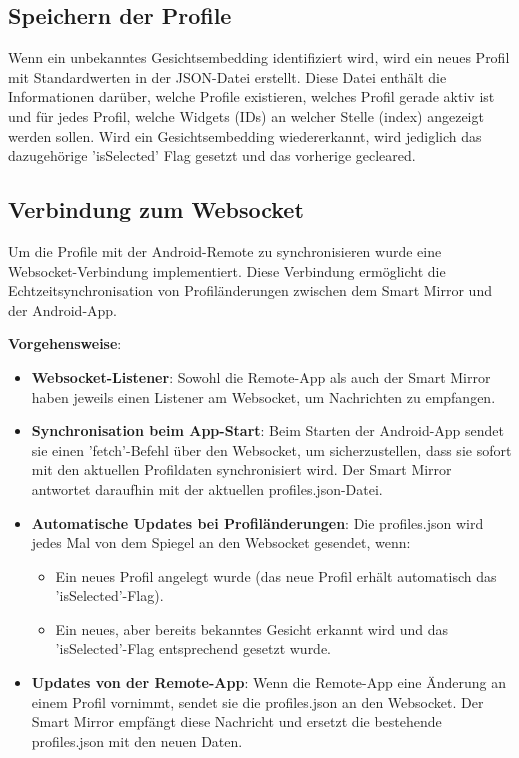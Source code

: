 \subsection{Speichern der Profile}
 Wenn ein unbekanntes Gesichtsembedding identifiziert wird, wird ein neues Profil mit Standardwerten in der JSON-Datei erstellt. Diese Datei enthält die Informationen darüber, welche Profile existieren, welches Profil gerade aktiv ist und für jedes Profil, welche Widgets (IDs) an welcher Stelle (index) angezeigt werden sollen. Wird ein Gesichtsembedding wiedererkannt, wird jediglich das dazugehörige 'isSelected' Flag gesetzt und das vorherige gecleared.


\subsection{Verbindung zum Websocket}
Um die Profile mit der Android-Remote zu synchronisieren wurde eine Websocket-Verbindung implementiert. Diese Verbindung ermöglicht die Echtzeitsynchronisation von Profiländerungen zwischen dem Smart Mirror und der Android-App.

\textbf{Vorgehensweise}:
\begin{itemize}
    \item \textbf{Websocket-Listener}: Sowohl die Remote-App als auch der Smart Mirror haben jeweils einen Listener am Websocket, um Nachrichten zu empfangen.
    
    \item \textbf{Synchronisation beim App-Start}: Beim Starten der Android-App sendet sie einen 'fetch'-Befehl über den Websocket, um sicherzustellen, dass sie sofort mit den aktuellen Profildaten synchronisiert wird. Der Smart Mirror antwortet daraufhin mit der aktuellen profiles.json-Datei.

    \item \textbf{Automatische Updates bei Profiländerungen}: Die profiles.json wird jedes Mal von dem Spiegel an den Websocket gesendet, wenn:
    \begin{itemize}
        \item Ein neues Profil angelegt wurde (das neue Profil erhält automatisch das 'isSelected'-Flag).
        \item Ein neues, aber bereits bekanntes Gesicht erkannt wird und das 'isSelected'-Flag entsprechend gesetzt wurde.
    \end{itemize}

    \item \textbf{Updates von der Remote-App}: Wenn die Remote-App eine Änderung an einem Profil vornimmt, sendet sie die profiles.json an den Websocket. Der Smart Mirror empfängt diese Nachricht und ersetzt die bestehende profiles.json mit den neuen Daten.
\end{itemize}

